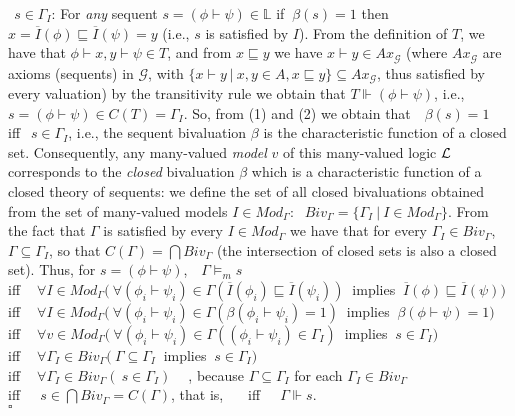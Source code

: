 \documentclass[10pt,twocolumn]{article}
\newcommand{\G}{\mathcal{G}} \renewcommand{\H}{\mathcal{H}}
\begin{document}
$~~ s\in \Gamma_I$:
 For \emph{any} sequent $s =(\phi \vdash \psi) \in \mathbb{L}$ if $~\beta(s) = 1$ then $x = \overline{I}(\phi) \sqsubseteq \overline{I}(\psi) = y$
 (i.e., $s$ is satisfied by $I$).
From the definition of $T$, we have that $\phi \vdash x, y \vdash
\psi \in T$, and from $ x\sqsubseteq y$ we have  $x \vdash y \in
Ax_{\G}$ (where $Ax_{\G}$ are axioms (sequents) in $\G$, with $\{ x
\vdash y~|~x,y \in A, x \sqsubseteq y \} \subseteq Ax_{\G}$,
 thus satisfied by every valuation) by the transitivity rule we obtain that $T \Vdash (\phi \vdash
\psi)$,
 i.e., $s =(\phi \vdash \psi) \in  C(T) = \Gamma_I$.
So, from (1) and (2) we obtain that $~~~\beta(s) = 1~~$ iff $~~ s\in
\Gamma_I$, i.e., the sequent bivaluation $\beta$
 is the characteristic function of a closed set.
  Consequently, any many-valued \emph{model} $v$ of this many-valued logic $\mathcal{L}$
corresponds to the \emph{closed} bivaluation $\beta$ which is a
characteristic function of a closed theory of sequents:  we define
the set of all closed bivaluations obtained from the set of
many-valued models $I \in Mod_{\Gamma}$: $~~Biv_{\Gamma} =
\{\Gamma_{I}~|~I \in Mod_{\Gamma} \}$. From the fact that $\Gamma$
is satisfied by every $I \in Mod_{\Gamma}$ we have that for every
$\Gamma_I \in Biv_{\Gamma}$, $\Gamma \subseteq \Gamma_I$, so that
$C(\Gamma) = \bigcap Biv_{\Gamma}$ (the intersection of closed sets
is also a closed set).
 Thus, for $s = (\phi \vdash \psi)$,
$~~~\Gamma \models_m s~~$\\ iff $~~~~\forall I \in
 Mod_{\Gamma} (~ \forall (\phi_i \vdash \psi_i) \in \Gamma(\overline{I}(\phi_i) \sqsubseteq
 \overline{I}(\psi_i))~$ implies $~\overline{I}(\phi) \sqsubseteq \overline{I}(\psi))$\\
 iff $~~~~\forall I \in
 Mod_{\Gamma} (~ \forall (\phi_i \vdash \psi_i) \in \Gamma(\beta(\phi_i \vdash
 \psi_i) = 1)~$ implies $~\beta(\phi\vdash \psi) = 1)$\\
 iff $~~~~\forall v \in
 Mod_{\Gamma} (~ \forall (\phi_i \vdash \psi_i) \in \Gamma((\phi_i \vdash
 \psi_i) \in \Gamma_I)~$ implies $~s \in \Gamma_I)$\\
 iff $~~~~\forall \Gamma_I \in
 Biv_{\Gamma} (~ \Gamma \subseteq \Gamma_I~$ implies $~s \in
 \Gamma_I)$  \\
 iff $~~~~\forall \Gamma_I \in
 Biv_{\Gamma} (~s \in
 \Gamma_I)$ $~~~~$,  because $\Gamma \subseteq \Gamma_I$ for each  $\Gamma_I \in Biv_{\Gamma}$\\
 iff $~~~~~s \in
 \bigcap Biv_{\Gamma} = C(\Gamma)$, that is, $~~~~~$ iff $~~~~~\Gamma \Vdash s$.
 \\$\square$\\
\end{document}
